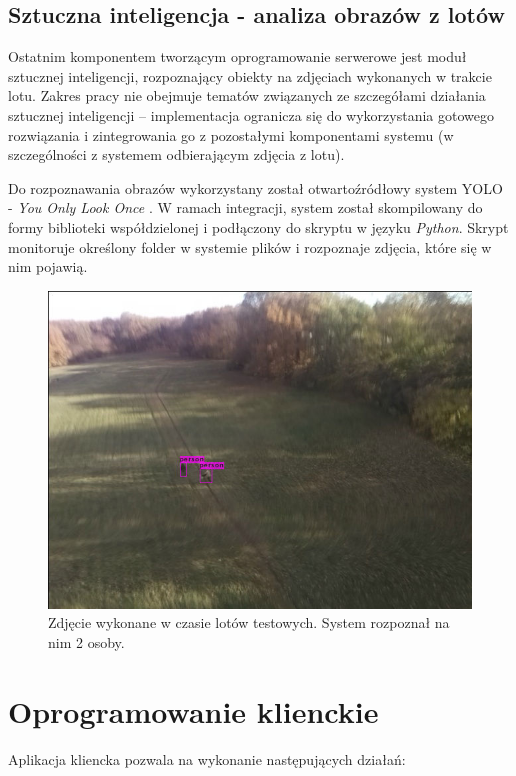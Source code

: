 \subsection{Sztuczna inteligencja - analiza obrazów z lotów}

Ostatnim komponentem tworzącym oprogramowanie serwerowe jest moduł sztucznej inteligencji,
rozpoznający obiekty na zdjęciach wykonanych w trakcie lotu. Zakres pracy nie obejmuje
tematów związanych ze szczegółami działania sztucznej inteligencji -- implementacja
ogranicza się do wykorzystania gotowego rozwiązania i zintegrowania
go z pozostałymi komponentami systemu (w szczególności z systemem
odbierającym zdjęcia z lotu).

Do rozpoznawania obrazów wykorzystany został otwartoźródłowy system
YOLO - \textit{You Only Look Once} \cite{yolo}. W ramach integracji, system został
skompilowany do formy biblioteki współdzielonej i podłączony do skryptu
w języku \textit{Python}. Skrypt monitoruje określony folder w systemie plików
i rozpoznaje zdjęcia, które się w nim pojawią.


\begin{figure}[H]
	\centering
\includegraphics[width=.7\linewidth]{rys03/rozpoznane_yolo.jpg}
	\caption{ Zdjęcie wykonane w czasie lotów testowych. System rozpoznał na nim 2 osoby.}
	\label{yolo_example}
\end{figure}

\section{Oprogramowanie klienckie}

Aplikacja kliencka pozwala na wykonanie następujących działań:

